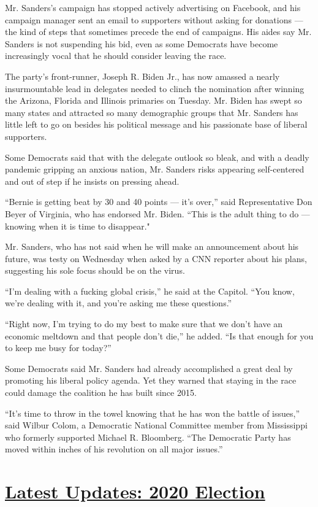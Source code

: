 Mr. Sanders's campaign has stopped actively advertising on Facebook, and
his campaign manager sent an email to supporters without asking for
donations --- the kind of steps that sometimes precede the end of
campaigns. His aides say Mr. Sanders is not suspending his bid, even as
some Democrats have become increasingly vocal that he should consider
leaving the race.

The party's front-runner, Joseph R. Biden Jr., has now amassed a nearly
insurmountable lead in delegates needed to clinch the nomination after
winning the Arizona, Florida and Illinois primaries on Tuesday. Mr.
Biden has swept so many states and attracted so many demographic groups
that Mr. Sanders has little left to go on besides his political message
and his passionate base of liberal supporters.

Some Democrats said that with the delegate outlook so bleak, and with a
deadly pandemic gripping an anxious nation, Mr. Sanders risks appearing
self-centered and out of step if he insists on pressing ahead.

``Bernie is getting beat by 30 and 40 points --- it's over,'' said
Representative Don Beyer of Virginia, who has endorsed Mr. Biden. ``This
is the adult thing to do --- knowing when it is time to disappear."

Mr. Sanders, who has not said when he will make an announcement about
his future, was testy on Wednesday when asked by a CNN reporter about
his plans, suggesting his sole focus should be on the virus.

``I'm dealing with a fucking global crisis,'' he said at the Capitol.
``You know, we're dealing with it, and you're asking me these
questions.''

``Right now, I'm trying to do my best to make sure that we don't have an
economic meltdown and that people don't die,'' he added. ``Is that
enough for you to keep me busy for today?''

Some Democrats said Mr. Sanders had already accomplished a great deal by
promoting his liberal policy agenda. Yet they warned that staying in the
race could damage the coalition he has built since 2015.

``It's time to throw in the towel knowing that he has won the battle of
issues,'' said Wilbur Colom, a Democratic National Committee member from
Mississippi who formerly supported Michael R. Bloomberg. ``The
Democratic Party has moved within inches of his revolution on all major
issues.''

\hypertarget{latest-updates-2020-election}{%
\section{\texorpdfstring{\href{https://www.nytimes.com/2020/07/31/us/elections/biden-vs-trump.html?action=click\&pgtype=Article\&state=default\&region=MAIN_CONTENT_1\&context=storylines_live_updates}{Latest
Updates: 2020
Election}}{Latest Updates: 2020 Election}}\label{latest-updates-2020-election}}


